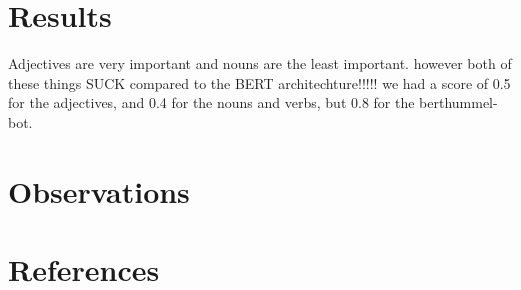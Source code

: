 \documentclass{article}
\begin{document}
\section{Results}
Adjectives are very important and nouns are the least important.  however both of these things SUCK compared to the BERT architechture!!!!! we had a score of 0.5 for the adjectives, and 0.4 for the nouns and verbs, but 0.8 for the berthummel-bot.  

\section{Observations}

\section{References}
\end{document}
